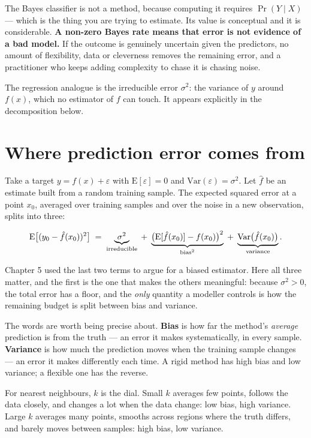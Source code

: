\documentclass[
  letterpaper,
  10pt,
  twoside,
  openright,
  numbers=noenddot,
  chapterprefix=true]{scrbook}
\begin{document}
The Bayes classifier is not a method, because computing it requires
\(\Pr(Y \mid X)\) --- which is the thing you are trying to estimate. Its
value is conceptual and it is considerable. \textbf{A non-zero Bayes
rate means that error is not evidence of a bad model.} If the outcome is
genuinely uncertain given the predictors, no amount of flexibility, data
or cleverness removes the remaining error, and a practitioner who keeps
adding complexity to chase it is chasing noise.

The regression analogue is the irreducible error \(\sigma^2\): the
variance of \(y\) around \(f(x)\), which no estimator of \(f\) can
touch. It appears explicitly in the decomposition below.

\section{Where prediction error comes
from}\label{where-prediction-error-comes-from}

Take a target \(y = f(x) + \varepsilon\) with
\(\mathrm{E}[\varepsilon] = 0\) and
\(\mathrm{Var}(\varepsilon) = \sigma^2\). Let \(\hat f\) be an estimate
built from a random training sample. The expected squared error at a
point \(x_0\), averaged over training samples and over the noise in a
new observation, splits into three:

\[
\mathrm{E}\big[(y_0 - \hat f(x_0))^2\big]
\thickspace=\thickspace
\underbrace{\sigma^2}_{\text{irreducible}}
\thickspace+\thickspace
\underbrace{\big(\mathrm{E}[\hat f(x_0)] - f(x_0)\big)^2}_{\text{bias}^2}
\thickspace+\thickspace
\underbrace{\mathrm{Var}\big(\hat f(x_0)\big)}_{\text{variance}} .
\]

Chapter 5 used the last two terms to argue for a biased estimator. Here
all three matter, and the first is the one that makes the others
meaningful: because \(\sigma^2 > 0\), the total error has a floor, and
the \emph{only} quantity a modeller controls is how the remaining budget
is split between bias and variance.

The words are worth being precise about. \textbf{Bias} is how far the
method's \emph{average} prediction is from the truth --- an error it
makes systematically, in every sample. \textbf{Variance} is how much the
prediction moves when the training sample changes --- an error it makes
differently each time. A rigid method has high bias and low variance; a
flexible one has the reverse.

For nearest neighbours, \(k\) is the dial. Small \(k\) averages few
points, follows the data closely, and changes a lot when the data
change: low bias, high variance. Large \(k\) averages many points,
smooths across regions where the truth differs, and barely moves between
samples: high bias, low variance.
\end{document}
